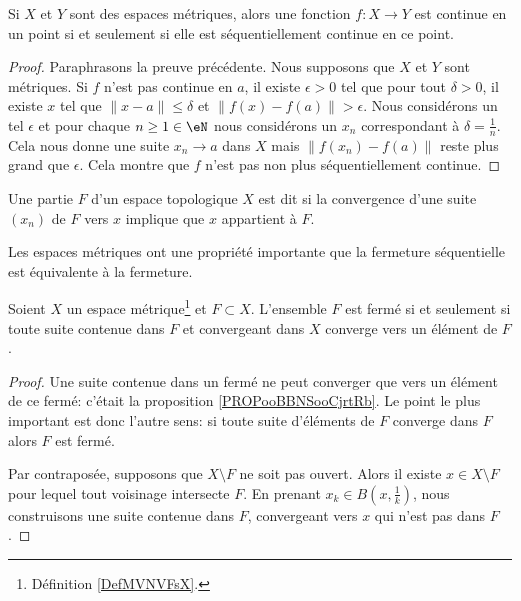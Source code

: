 \begin{corollary}  \label{PROPooBHRBooJMZYSg}
	Si \( X\) et \( Y\) sont des espaces métriques, alors une fonction \( f\colon X\to Y\) est continue en un point si et seulement si elle est séquentiellement continue en ce point.
\end{corollary}

\begin{proof}
	Paraphrasons la preuve précédente. Nous supposons que \( X\) et \( Y\) sont métriques. Si \( f\) n'est pas continue en \( a\), il existe \( \epsilon>0\) tel que pour tout \( \delta>0\), il existe \( x\) tel que \( \| x-a \|\leq\delta\) et \( \| f(x)-f(a) \|>\epsilon\). Nous considérons un tel \( \epsilon\) et pour chaque \( n\geq1\in \eN\) nous considérons un \( x_n\) correspondant à \( \delta=\frac{1}{ n }\). Cela nous donne une suite \( x_n\to a\) dans \( X\) mais \( \| f(x_n) -f(a)\|\) reste plus grand que \( \epsilon\). Cela montre que \( f\) n'est pas non plus séquentiellement continue.
\end{proof}


\begin{definition}
	Une partie \( F\) d'un espace topologique \( X\) est dit  si la convergence d'une suite \( (x_n)\) de \( F\) vers \( x\) implique que \( x\) appartient à \( F\).
\end{definition}

Les espaces métriques ont une propriété importante que la fermeture séquentielle est équivalente à la fermeture.

\begin{proposition}    \label{PropLFBXIjt}
	Soient \( X\) un espace métrique\footnote{Définition \ref{DefMVNVFsX}.} et \( F\subset X\). L'ensemble \( F\) est fermé si et seulement si toute suite contenue dans \( F\) et convergeant dans \( X\) converge vers un élément de \( F\).
\end{proposition}

\begin{proof}
	Une suite contenue dans un fermé ne peut converger que vers un élément de ce fermé: c'était la proposition \ref{PROPooBBNSooCjrtRb}. Le point le plus important est donc l'autre sens: si toute suite d'éléments de \( F \) converge dans \( F \) alors \( F \) est fermé.

	Par contraposée, supposons que \( X\setminus F\) ne soit pas ouvert. Alors il existe \( x\in X\setminus F\) pour lequel tout voisinage intersecte \( F\). En prenant \( x_k\in B(x,\frac{1}{ k })\), nous construisons une suite contenue dans \( F\), convergeant vers \( x\) qui n'est pas dans \( F \).
\end{proof}


